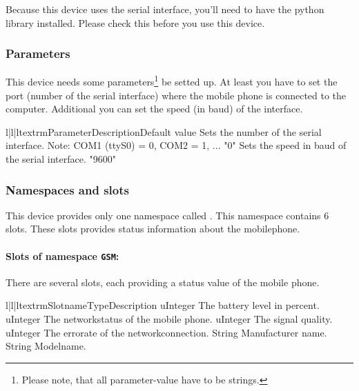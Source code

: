 \begin{notice}
Because this device uses the serial interface, you'll need to have the  
python library installed. Please check this before you use this device.
\end{notice}

\subsubsection{Parameters}
This device needs some parameters\footnote{Please note, that all 
parameter-value have to be strings.} be setted up. At least you have to set 
the port (number of the serial interface) where the mobile phone is connected 
to the computer. Additional you can set the speed (in baud) of the interface.
\begin{tableiii}{l|l|l}{textrm}{Parameter}{Description}{Default value}
        {Sets the number of the serial interface. Note: COM1 (ttyS0) = 0, COM2 = 1, ...} 
        {"0"}
        {Sets the speed in baud of the serial interface.}
        {"9600"}
\end{tableiii}

\subsubsection{Namespaces and slots}
This device provides only one namespace called . This namespace 
contains 6 slots. These slots provides status information about the 
mobilephone.

\paragraph{Slots of namespace \texttt{GSM}:}
There are several slots, each providing a status value of the mobile phone.
\begin{tableiii}{l|l|l}{textrm}{Slotname}{Type}{Description}
        {uInteger}
        {The battery level in percent.}
        {uInteger}
        {The networkstatus of the mobile phone.}
        {uInteger}
        {The signal quality.}
        {uInteger}
        {The errorate of the networkconnection.}
        {String}
        {Manufacturer name.}
        {String}
        {Modelname.}
\end{tableiii}


